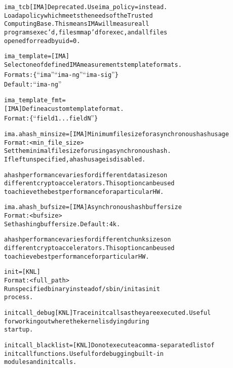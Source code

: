 \documentclass[a4paper,8pt,english]{sphinxmanual}
\begin{document}
\begin{alltt}
        ima\_tcb         {[}IMA{]} Deprecated.  Use ima\_policy= instead.
                        Load a policy which meets the needs of the Trusted
                        Computing Base.  This means IMA will measure all
                        programs exec'd, files mmap'd for exec, and all files
                        opened for read by uid=0.

        ima\_template=   {[}IMA{]}
                        Select one of defined IMA measurements template formats.
                        Formats: \{ ``ima'' \textbar{} ``ima-ng'' \textbar{} ``ima-sig'' \}
                        Default: ``ima-ng''

        ima\_template\_fmt=
                        {[}IMA{]} Define a custom template format.
                        Format: \{ ``field1\textbar{}...\textbar{}fieldN'' \}

        ima.ahash\_minsize= {[}IMA{]} Minimum file size for asynchronous hash usage
                        Format: \textless{}min\_file\_size\textgreater{}
                        Set the minimal file size for using asynchronous hash.
                        If left unspecified, ahash usage is disabled.

                        ahash performance varies for different data sizes on
                        different crypto accelerators. This option can be used
                        to achieve the best performance for a particular HW.

        ima.ahash\_bufsize= {[}IMA{]} Asynchronous hash buffer size
                        Format: \textless{}bufsize\textgreater{}
                        Set hashing buffer size. Default: 4k.

                        ahash performance varies for different chunk sizes on
                        different crypto accelerators. This option can be used
                        to achieve best performance for particular HW.

        init=           {[}KNL{]}
                        Format: \textless{}full\_path\textgreater{}
                        Run specified binary instead of /sbin/init as init
                        process.

        initcall\_debug  {[}KNL{]} Trace initcalls as they are executed.  Useful
                        for working out where the kernel is dying during
                        startup.

        initcall\_blacklist=  {[}KNL{]} Do not execute a comma-separated list of
                        initcall functions.  Useful for debugging built-in
                        modules and initcalls.


\end{alltt}
\end{document}
